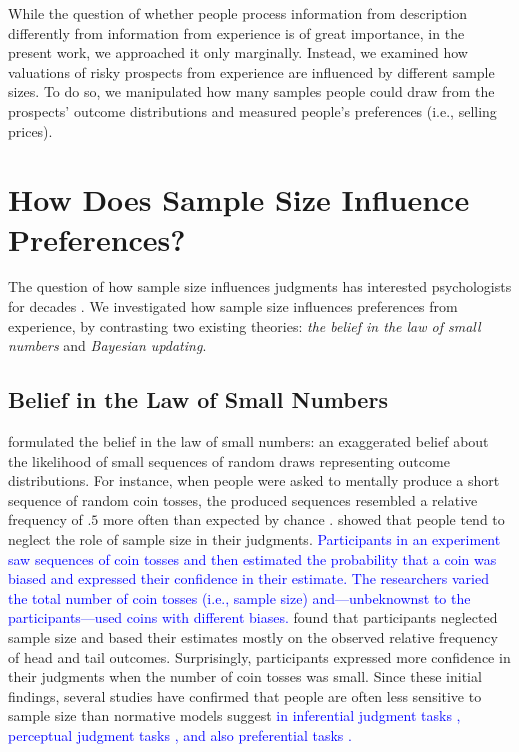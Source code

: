 \documentclass[a4paper, man, natbib, floatsintext]{apa6} %
\begin{document}
While the question of whether people process information from description differently from information from experience is of great importance, in the present work, we approached it only marginally. Instead, we examined how valuations of risky prospects from experience are influenced by different sample sizes. To do so, we manipulated how many samples people could draw from the prospects' outcome distributions and measured people's preferences (i.e., selling prices).



\section{How Does Sample Size Influence Preferences?}
The question of how sample size influences judgments has interested psychologists for decades \citep[e.g.,][]{Tversky1971, Griffin1992}. We investigated how sample size influences preferences from experience, by contrasting two existing theories: \textit{the belief in the law of small numbers} \citep{Tversky1971} and \textit{Bayesian updating}. 

\subsection{Belief in the Law of Small Numbers}
\cite{Tversky1971} formulated the belief in the law of small numbers: an exaggerated belief about the likelihood of small sequences of random draws representing outcome distributions. %
For instance, when people were asked to mentally produce a short sequence of random coin tosses, the produced sequences resembled a relative frequency of $.5$ more often than expected by chance \citep{Tversky1971}. \cite{Griffin1992} showed that people tend to neglect the role of sample size in their judgments. \textcolor{blue}{Participants in an experiment saw sequences of coin tosses and then estimated the probability that a coin was biased and expressed their confidence in their estimate. The researchers varied the total number of coin tosses (i.e., sample size) and---unbeknownst to the participants---used coins with different biases.} \cite{Griffin1992} found that participants neglected sample size and based their estimates mostly on the observed relative frequency of head and tail outcomes. Surprisingly, participants expressed more confidence in their judgments when the number of coin tosses was small. Since these initial findings, several studies have confirmed that people are often less sensitive to sample size than normative models suggest \textcolor{blue}{in inferential judgment tasks \citep[e.g.,][]{Kutzner2016}, perceptual judgment tasks \citep[e.g.,][]{Kvam2016}, and also preferential tasks \citep[e.g.,][]{Powell2017}.}  
\end{document}
